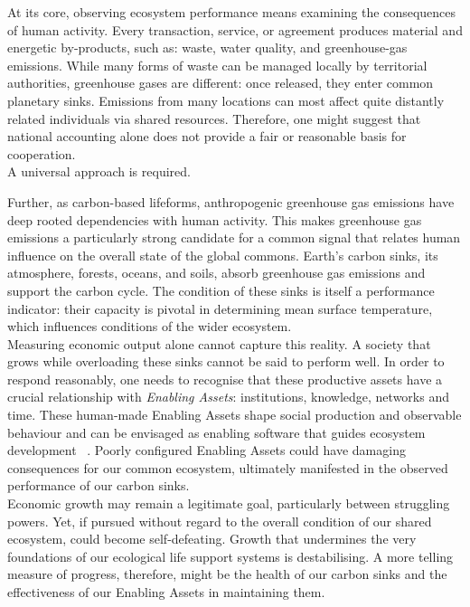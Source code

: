 \documentclass[10pt, oneside]{article}   	%
\begin{document}
At its core, observing ecosystem performance means examining the consequences of human activity.
Every transaction, service, or agreement produces material and energetic by-products, such as: waste, water quality, and greenhouse-gas emissions.
While many forms of waste can be managed locally by territorial authorities, greenhouse gases are different: once released, they enter common planetary sinks.
Emissions from many locations can most affect quite distantly related individuals via shared resources.
Therefore, one might suggest that national accounting alone does not provide a fair or reasonable basis for cooperation.\\
A universal approach is required.

Further, as carbon-based lifeforms, anthropogenic greenhouse gas emissions have deep rooted dependencies with human activity.
This makes greenhouse gas emissions a particularly strong candidate for a common signal that relates human influence on the overall state of the global commons.
Earth’s carbon sinks, its atmosphere, forests, oceans, and soils, absorb greenhouse gas emissions and support the carbon cycle.
The condition of these sinks is itself a performance indicator: their capacity is pivotal in determining mean surface temperature, which influences conditions of the wider ecosystem.\\

Measuring economic output alone cannot capture this reality.
A society that grows while overloading these sinks cannot be said to perform well.
In order to respond reasonably, one needs to recognise that these productive assets have a crucial relationship with \emph{Enabling Assets}: institutions, knowledge, networks and time.
These human-made Enabling Assets shape social production and observable behaviour and can be envisaged as enabling software that guides ecosystem development ~\cite{pd3}.
Poorly configured Enabling Assets could have damaging consequences for our common ecosystem, ultimately manifested in the observed performance of our carbon sinks.\\

Economic growth may remain a legitimate goal, particularly between struggling powers.
Yet, if pursued without regard to the overall condition of our shared ecosystem, could become self-defeating.
Growth that undermines the very foundations of our ecological life support systems is destabilising.
A more telling measure of progress, therefore, might be the health of our carbon sinks and the effectiveness of our Enabling Assets in maintaining them.\\
\end{document}
